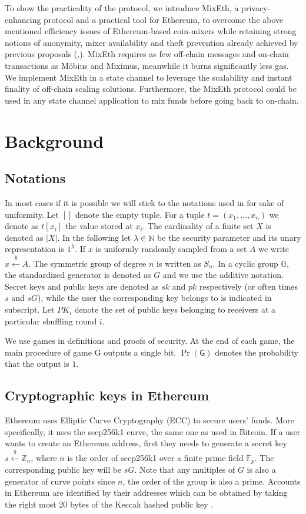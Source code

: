 \documentclass[conference, compsoc]{IEEEtran}
\theoremstyle{definition}
\begin{document}
To show the practicality of the protocol, we introduce MixEth, a privacy-enhancing protocol and a practical tool for Ethereum, to overcome the above mentioned efficiency issues of Ethereum-based coin-mixers while retaining strong notions of anonymity, mixer availability and theft prevention already achieved by previous proposals (\cite{meiklejohn2018mobius},\cite{miximus2018}). MixEth requires as few off-chain messages and on-chain transactions as Möbius and Miximus, meanwhile it burns significantly less gas. We implement MixEth in a state channel to leverage the scalability and instant finality of off-chain scaling solutions. Furthermore, the MixEth protocol could be used in any state channel application to mix funds before going back to on-chain.

\section{Background}
\subsection{Notations}
In most cases if it is possible we will stick to the notations used in \cite{meiklejohn2018mobius} for sake of uniformity. 
Let $[]$ denote the empty tuple. For a tuple $t=(x_1,\dots,x_n)$ we denote as $t[x_i]$ the value stored at $x_{i}$. The cardinality of a finite set $X$ is denoted as $|X|$. In the following let $\lambda \in \mathbb{N}$ be the security parameter and its unary representation is $1^{\lambda}$. If $x$ is uniformly randomly sampled from a set $A$ we write $x\stackrel{\$}{\leftarrow}A$. The symmetric group of degree $n$ is written as ${S}_n$. In a cyclic group $\mathbb{G}$, the standardized generator is denoted as $G$ and we use the additive notation. Secret keys and public keys are denoted as $sk$ and $pk$ respectively (or often times $s$ and $sG$), while the user the corresponding key belongs to is indicated in subscript. Let $PK_{i}$ denote the set of public keys belonging to receivers at a particular shuffling round $i$.

We use games in definitions and proofs of security. At the end of each game, the main procedure of game \textsf{G} outputs a single bit. $\Pr(\textsf{G})$ denotes the probability that the output is $1$.
\subsection{Cryptographic keys in Ethereum}
Ethereum uses Elliptic Curve Cryptography (ECC) to secure users' funds. More specifically, it uses the secp256k1 curve, the same one as used in Bitcoin. If a user wants to create an Ethereum address, first they needs to generate a secret key  $s\stackrel{\$}{\leftarrow}\mathbb{Z}_n$, where $n$ is the order of secp256k1 over a finite prime field $\mathbb{F}_{p}$. The corresponding public key will be $sG$. Note that any multiples of $G$ is also a generator of curve points since $n$, the order of the group is also a prime. Accounts in Ethereum are identified by their addresses which can be obtained by taking the right most 20 bytes of the Keccak hashed public key \cite{wood2014ethereum}. 
\end{document}
